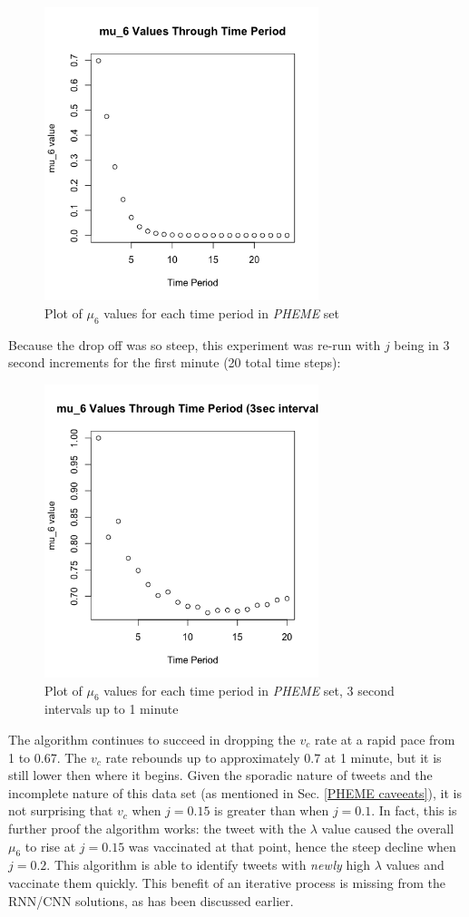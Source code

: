 \documentclass[preprint,review,12pt]{elsarticle}
\begin{document}
\begin{figure}[h!]
    \centering
    \includegraphics[width=8cm]{mu_6 pheme.png}
    \caption{Plot of $\mu_6$ values for each time period in \textit{PHEME} set}
    \label{fig:mu6 PHEME}
\end{figure}
 
Because the drop off was so steep, this experiment was re-run with $j$ being in 3 second increments for the first minute (20 total time steps):
\begin{figure}[h!]
    \centering
    \includegraphics[width=8cm]{mu_6 3 second intervals through one minute.png}
    \caption{Plot of $\mu_6$ values for each time period in \textit{PHEME} set, 3 second intervals up to 1 minute}
    \label{fig:mu6 PHEME 3s}
\end{figure}

The algorithm continues to succeed in dropping the $v_c$ rate at a rapid pace from 1 to 0.67. The $v_c$ rate rebounds up to approximately 0.7 at 1 minute, but it is still lower then where it begins. Given the sporadic nature of tweets and the incomplete nature of this data set (as mentioned in Sec. \ref{PHEME caveeats}), it is not surprising that $v_c$ when $j=0.15$ is greater than when $j = 0.1$. In fact, this is further proof the algorithm works: the tweet with the $\lambda$ value caused the overall $\mu_6$ to rise at $j = 0.15$ was vaccinated at that point, hence the steep decline when $j = 0.2$. This algorithm is able to identify tweets with \textit{newly} high $\lambda$ values and vaccinate them quickly. This benefit of an iterative process is missing from the RNN/CNN solutions, as has been discussed earlier.
\end{document}
